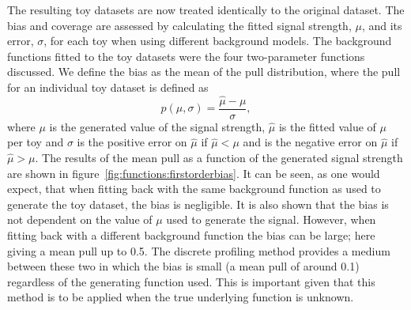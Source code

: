 The resulting toy datasets are now treated identically to the original dataset. The bias and coverage are assessed by calculating the fitted signal strength, $\mu$, and its error, $\sigma$, for each toy when using different background models. The background functions fitted to the toy datasets were the four two-parameter functions discussed. 
We define the bias as the mean of the pull distribution, where the pull for an individual toy dataset is defined as
\begin{displaymath}
	p(\mu,\sigma) = \frac{\hat{\mu}-\mu}{\sigma},
\end{displaymath}
where $\mu$ is the generated value of the signal strength, $\hat{\mu}$ is the fitted value of $\mu$ per toy and $\sigma$ is the positive error on $\hat{\mu}$ if $\hat{\mu} < \mu$ and is the negative error on $\hat{\mu}$ if $\hat{\mu} > \mu$. The results of the mean pull as a function of the generated signal strength are shown in figure~\ref{fig:functions:firstorderbias}. It can be seen, as one would expect, that when fitting back with the same background function as used to generate the toy dataset, the bias is negligible. It is also shown that the bias is not dependent on the value of $\mu$ used to generate the signal. However, when fitting back with a different background function the bias can be large; here giving a mean pull up to 0.5.
The discrete profiling method provides a medium between these two in which the bias is small (a mean pull of around 0.1) regardless of the generating function used. This is important given that this method is to be applied when the true underlying function is unknown.
%
